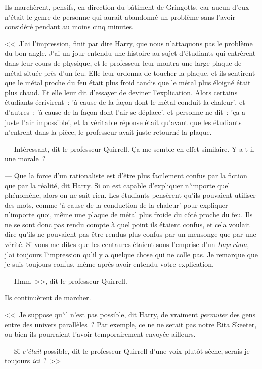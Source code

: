 Ils marchèrent, pensifs, en direction du bâtiment de Gringotts, car aucun d'eux n'était le genre de personne qui aurait abandonné un problème sans l'avoir considéré pendant au moins cinq minutes.

<<~J'ai l'impression, finit par dire Harry, que nous n'attaquons pas le problème du bon angle. J'ai un jour entendu une histoire au sujet d'étudiants qui entrèrent dans leur cours de physique, et le professeur leur montra une large plaque de métal située près d'un feu. Elle leur ordonna de toucher la plaque, et ils sentirent que le métal proche du feu était plus froid tandis que le métal plus éloigné était plus chaud. Et elle leur dit d'essayer de deviner l'explication. Alors certains étudiants écrivirent~: 'à cause de la façon dont le métal conduit la chaleur', et d'autres~: 'à cause de la façon dont l'air se déplace', et personne ne dit~: 'ça a juste l'air impossible', et la véritable réponse était qu'avant que les étudiants n'entrent dans la pièce, le professeur avait juste retourné la plaque.

--- Intéressant, dit le professeur Quirrell. Ça me semble en effet similaire. Y a-t-il une morale~?

--- Que la force d'un rationaliste est d'être plus facilement confus par la fiction que par la réalité, dit Harry. Si on est capable d'expliquer n'importe quel phénomène, alors on ne sait rien. Les étudiants pensèrent qu'ils pouvaient utiliser des mots, comme 'à cause de la conduction de la chaleur' pour expliquer n'importe quoi, même une plaque de métal plus froide du côté proche du feu. Ils ne se sont donc pas rendu compte à quel point ils étaient confus, et cela voulait dire qu'ils ne pouvaient pas être rendus plus confus par un mensonge que par une vérité. Si vous me dites que les centaures étaient sous l'emprise d'un \emph{Imperium}, j'ai toujours l'impression qu'il y a quelque chose qui ne colle pas. Je remarque que je suis toujours confus, même après avoir entendu votre explication.

--- Hmm~>>, dit le professeur Quirrell.

Ils continuèrent de marcher.

<<~Je suppose qu'il n'est pas possible, dit Harry, de vraiment \emph{permuter} des gens entre des univers parallèles~? Par exemple, ce ne ne serait pas notre Rita Skeeter, ou bien ils pourraient l'avoir temporairement envoyée ailleurs.

--- Si \emph{c'était} possible, dit le professeur Quirrell d'une voix plutôt sèche, serais-je toujours \emph{ici}~?~>>

